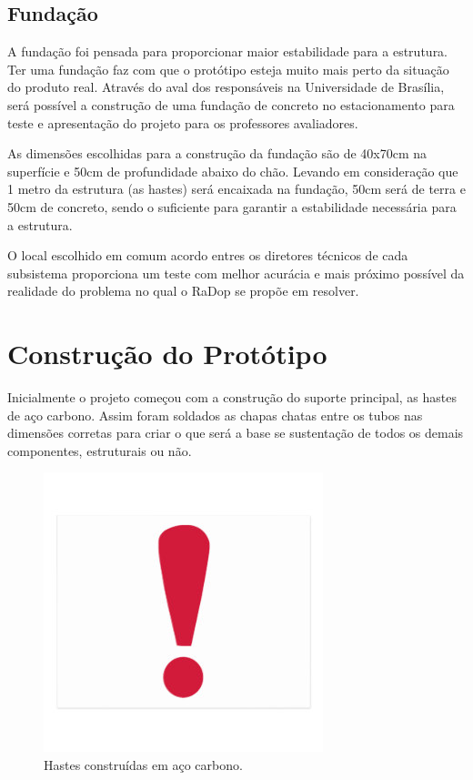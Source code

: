 \subsection{Fundação}

A fundação foi pensada para proporcionar maior estabilidade para a estrutura. Ter uma fundação faz com que o protótipo esteja muito mais perto da situação do produto real. Através do aval dos responsáveis na Universidade de Brasília, será possível a construção de uma fundação de concreto no estacionamento para teste e apresentação do projeto para os professores avaliadores. 

As dimensões escolhidas para a construção da fundação são de 40x70cm na superfície e 50cm de profundidade abaixo do chão. Levando em consideração que 1 metro da estrutura (as hastes) será encaixada na fundação, 50cm será de terra e 50cm de concreto, sendo o suficiente para garantir a estabilidade necessária para a estrutura.

O local escolhido em comum acordo entres os diretores técnicos de cada subsistema proporciona um teste com melhor acurácia e mais próximo possível da realidade do problema no qual o RaDop se propõe em resolver. 

\section{Construção do Protótipo}

Inicialmente o projeto começou com a construção do suporte principal, as hastes de aço carbono. Assim foram soldados as chapas chatas entre os tubos nas dimensões corretas para criar o que será a base se sustentação de todos os demais componentes, estruturais ou não. 

\begin{figure}[H]
	\centering
    \includegraphics[keepaspectratio=true,scale=1]{figuras/nophoto.jpg}
    \caption{Hastes construídas em aço carbono.}
    \label{hastescons}
\end{figure}

